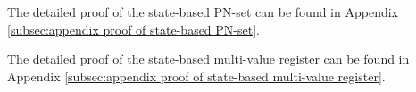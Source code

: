 The detailed proof of the state-based PN-set can be found in Appendix \ref{subsec:appendix proof of state-based PN-set}. 

The detailed proof of the state-based multi-value register can be found in Appendix \ref{subsec:appendix proof of state-based multi-value register}.


 



